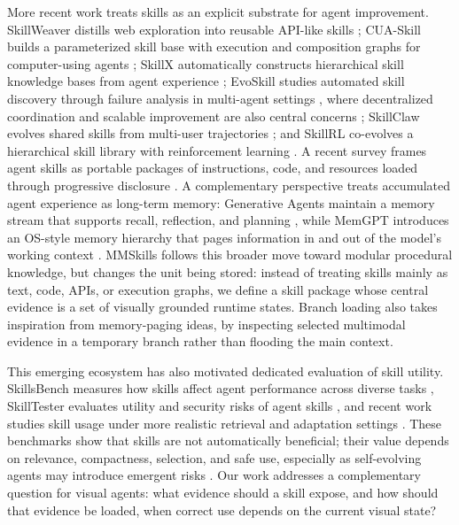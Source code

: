 \documentclass{llmxive}
\begin{document}
More recent work treats skills as an explicit substrate for agent improvement. SkillWeaver distills web exploration into reusable API-like skills \citep{zheng2025skillweaver}; CUA-Skill builds a parameterized skill base with execution and composition graphs for computer-using agents \citep{chen2026cuaskill}; SkillX automatically constructs hierarchical skill knowledge bases from agent experience \citep{wang2026skillx}; EvoSkill studies automated skill discovery through failure analysis in multi-agent settings \citep{alzubi2026evoskill}, where decentralized coordination and scalable improvement are also central concerns \citep{yang2025agentnetdecentralizedevolutionarycoordination,shao2026monoscalescalingmultiagentmonotonic}; SkillClaw evolves shared skills from multi-user trajectories \citep{ma2026skillclawletskillsevolve}; and SkillRL co-evolves a hierarchical skill library with reinforcement learning \citep{xia2026skillrlevolvingagentsrecursive}. A recent survey frames agent skills as portable packages of instructions, code, and resources loaded through progressive disclosure \citep{xu2026agentskills}. A complementary perspective treats accumulated agent experience as long-term memory: Generative Agents maintain a memory stream that supports recall, reflection, and planning \citep{park2023generativeagentsinteractivesimulacra}, while MemGPT introduces an OS-style memory hierarchy that pages information in and out of the model's working context \citep{packer2024memgptllmsoperatingsystems}. MMSkills follows this broader move toward modular procedural knowledge, but changes the unit being stored: instead of treating skills mainly as text, code, APIs, or execution graphs, we define a skill package whose central evidence is a set of visually grounded runtime states. Branch loading also takes inspiration from memory-paging ideas, by inspecting selected multimodal evidence in a temporary branch rather than flooding the main context.

This emerging ecosystem has also motivated dedicated evaluation of skill utility. SkillsBench measures how skills affect agent performance across diverse tasks \citep{li2026skillsbenchbenchmarkingagentskills}, SkillTester evaluates utility and security risks of agent skills \citep{wang2026skilltesterbenchmarkingutilitysecurity}, and recent work studies skill usage under more realistic retrieval and adaptation settings \citep{liu2026agenticskillsworkwild}. These benchmarks show that skills are not automatically beneficial; their value depends on relevance, compactness, selection, and safe use, especially as self-evolving agents may introduce emergent risks \citep{shao2026agentmisevolveemergentrisks}. Our work addresses a complementary question for visual agents: what evidence should a skill expose, and how should that evidence be loaded, when correct use depends on the current visual state?
\end{document}
